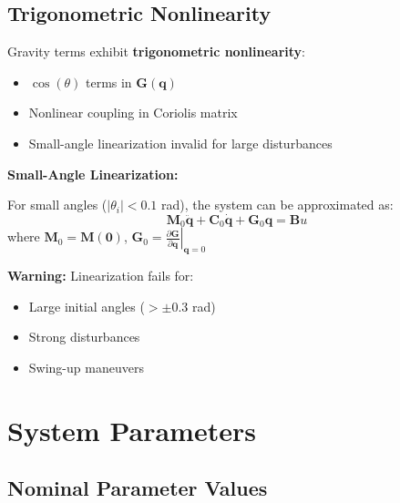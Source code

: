 \documentclass[11pt,a4paper]{article}
\newenvironment{example}[1][Example]{%
  \par\noindent\textcolor{highlightgreen}{\textbf{#1:}}\quad
}{\par}
\begin{document}
\subsection{Trigonometric Nonlinearity}

Gravity terms exhibit \textbf{trigonometric nonlinearity}:
\begin{itemize}
    \item $\cos(\theta)$ terms in $\mathbf{G}(\mathbf{q})$
    \item Nonlinear coupling in Coriolis matrix
    \item Small-angle linearization invalid for large disturbances
\end{itemize}

\begin{example}[Small-Angle Linearization]
For small angles ($|\theta_i| < 0.1$ rad), the system can be approximated as:
\begin{equation}
    \mathbf{M}_0\ddot{\mathbf{q}} + \mathbf{C}_0\dot{\mathbf{q}} + \mathbf{G}_0\mathbf{q} = \mathbf{B}u
\end{equation}
where $\mathbf{M}_0 = \mathbf{M}(\mathbf{0})$, $\mathbf{G}_0 = \left.\frac{\partial \mathbf{G}}{\partial \mathbf{q}}\right|_{\mathbf{q}=0}$

\textbf{Warning:} Linearization fails for:
\begin{itemize}
    \item Large initial angles ($> \pm 0.3$ rad)
    \item Strong disturbances
    \item Swing-up maneuvers
\end{itemize}
\end{example}


\section{System Parameters}

\subsection{Nominal Parameter Values}
\end{document}
